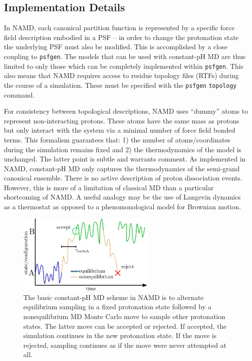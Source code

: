 \subsection{Implementation Details}

In NAMD, each canonical partition function is represented by a specific force
  field description embodied in a PSF -- in order to change the protonation
  state the underlying PSF must also be modified.
This is accomplished by a close coupling to \texttt{psfgen}.
The models that can be used with constant-pH MD are thus limited to only those
  which can be completely implemented within \texttt{psfgen}.
This also means that NAMD requires access to residue topology files (RTFs)
  during the course of a simulation.
These must be specified with the \texttt{psfgen} \texttt{topology} command.

For consistency between topological descriptions, NAMD uses ``dummy'' atoms to
  represent non-interacting protons.
These atoms have the same mass as protons but only interact with the system
  via a minimal number of force field bonded terms.
This formalism guarantees that:
  1) the number of atoms/coordinates during the simulation remains fixed
  and
  2) the thermodynamics of the model is unchanged.
The latter point is subtle and warrants comment.
As implemented in NAMD, constant-pH MD only captures the thermodynamics of
  the semi-grand canonical ensemble.
There is no active description of proton dissociation events.
However, this is more of a limitation of classical MD than a particular
  shortcoming of NAMD.
A useful analogy may be the use of Langevin dynamics as a thermostat as
  opposed to a phenomonological model for Brownian motion.

\begin{figure}[h]\centering
  \includegraphics[width=0.6\textwidth]{figures/namdcph_nemdmc_scheme}
  \caption{\label{fig:namdcph_nemdmc}
    The basic constant-pH MD scheme in NAMD is to alternate equilibrium 
      sampling in a fixed protonation state followed by a nonequilibrium MD
      Monte Carlo move to sample other protonation states.      
    The latter move can be accepted or rejected.
    If accepted, the simulation continues in the new protonation state.
    If the move is rejected, sampling continues as if the move were never
      attempted at all.
  }
\end{figure}

